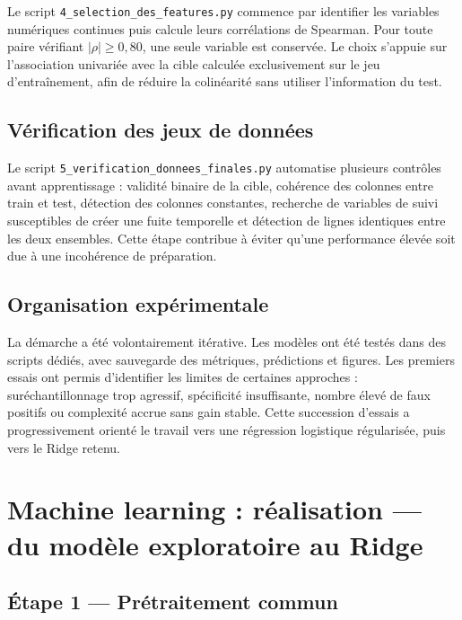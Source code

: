 \documentclass[12pt,a4paper]{report}
\begin{document}
Le script \texttt{4\_selection\_des\_features.py} commence par identifier les variables
numériques continues puis calcule leurs corrélations de Spearman. Pour toute paire vérifiant
$|\rho|\geq 0{,}80$, une seule variable est conservée. Le choix s'appuie sur l'association
univariée avec la cible calculée exclusivement sur le jeu d'entraînement, afin de réduire la
colinéarité sans utiliser l'information du test.


\subsection{Vérification des jeux de données}

Le script \texttt{5\_verification\_donnees\_finales.py} automatise plusieurs contrôles
avant apprentissage : validité binaire de la cible, cohérence des colonnes entre train et
test, détection des colonnes constantes, recherche de variables de suivi susceptibles de
créer une fuite temporelle et détection de lignes identiques entre les deux ensembles.
Cette étape contribue à éviter qu'une performance élevée soit due à une incohérence de
préparation.

\subsection{Organisation expérimentale}

La démarche a été volontairement itérative. Les modèles ont été testés dans des scripts
dédiés, avec sauvegarde des métriques, prédictions et figures. Les premiers essais ont
permis d'identifier les limites de certaines approches : suréchantillonnage trop agressif,
spécificité insuffisante, nombre élevé de faux positifs ou complexité accrue sans gain
stable. Cette succession d'essais a progressivement orienté le travail vers une régression
logistique régularisée, puis vers le Ridge retenu.

\section{Machine learning : réalisation --- du modèle exploratoire au Ridge}

\subsection{Étape 1 --- Prétraitement commun}
\end{document}
